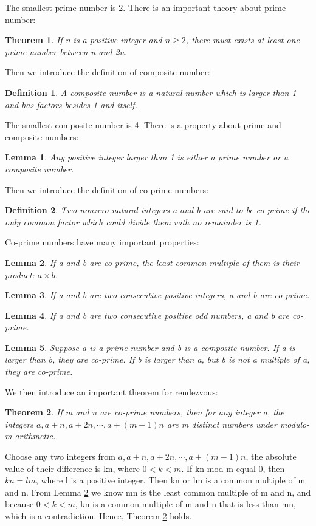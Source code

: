 \documentclass[10pt, conference, letterpaper]{IEEEtran}
\newtheorem{theorem}{Theorem}
\newtheorem{lemma}{Lemma}[section]
\newtheorem{definition}{Definition}[section]
\begin{document}
The smallest prime number is 2. There is an important theory about prime number:
\begin{theorem}
If n is a positive integer and $n \ge 2$, there must exists at least one prime number between n and 2n.
\end{theorem}

Then we introduce the definition of composite number:
\begin{definition}
A composite number is a natural number which is larger than 1 and has factors besides 1 and itself.
\end{definition}

The smallest composite number is 4. There is a property about prime and composite numbers:

\begin{lemma}
Any positive integer larger than 1 is either a prime number or a composite number.
\end{lemma}

Then we introduce the definition of co-prime numbers:
\begin{definition}
Two nonzero natural integers a and b are said to be co-prime if the only common factor which could divide them with no remainder is 1.
\end{definition}

Co-prime numbers have many important properties:
\begin{lemma}
\label{lm2.2}
If a and b are co-prime, the least common multiple of them is their product: $a \times b$.
\end{lemma}
\begin{lemma}
\label{lm2.3}
If a and b are two consecutive positive integers, a and b are co-prime.
\end{lemma}
\begin{lemma}
\label{lm2.4}
If a and b are two consecutive positive odd numbers, a and b are co-prime.
\end{lemma}
\begin{lemma}
\label{lm2.5}
Suppose a is a prime number and b is a composite number. If a is larger than b, they are co-prime. If b is larger than a, but b is not a multiple of a, they are co-prime.
\end{lemma}

We then introduce an important theorem for rendezvous:
\begin{theorem}
\label{theo}
If m and n are co-prime numbers, then for any integer a, the integers $a, a + n, a + 2n,\cdots, a+(m-1)n$ are m distinct numbers under modulo-m arithmetic.
\end{theorem}
\begin{IEEEproof}
Choose any two integers from $a, a+n, a + 2n,\cdots, a+(m-1)n$, the absolute value of their difference is kn, where $0 < k < m$. If kn mod m equal 0, then $kn = lm$, where l is a positive integer. Then kn or lm is a common multiple of m and n. From Lemma \ref{lm2.2} we know mn is the least common multiple of m and n, and because $0 < k < m$, kn is a common multiple of m and n that is less than mn, which is a contradiction. Hence, Theorem \ref{theo} holds.
\end{IEEEproof}
\end{document}
